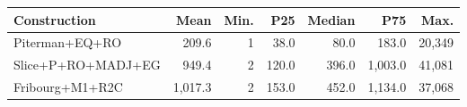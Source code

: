 \begin{tabular}{lrrrrrr}
  \hline
Construction & Mean & Min. & P25 & Median & P75 & Max. \\ 
  \hline
Piterman+EQ+RO & 209.6 & 1 & 38.0 & 80.0 & 183.0 & 20,349 \\ 
  Slice+P+RO+MADJ+EG & 949.4 & 2 & 120.0 & 396.0 & 1,003.0 & 41,081 \\ 
  Fribourg+M1+R2C & 1,017.3 & 2 & 153.0 & 452.0 & 1,134.0 & 37,068 \\ 
   \hline
\end{tabular}

